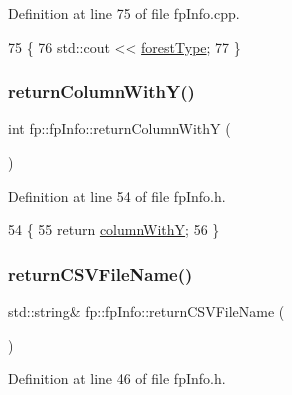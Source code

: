 Definition at line 75 of file fp\+Info.\+cpp.


\begin{DoxyCode}
75                                 \{
76         std::cout << \hyperlink{classfp_1_1fpInfo_a3001fbf80d86022e53578d6adf133b90}{forestType};
77     \}
\end{DoxyCode}
\mbox{\label{classfp_1_1fpInfo_a52ef3c184d39133dae472bb51e1287e7}} 
\subsubsection{\texorpdfstring{return\+Column\+With\+Y()}{returnColumnWithY()}}
{\footnotesize\ttfamily int fp\+::fp\+Info\+::return\+Column\+WithY (\begin{DoxyParamCaption}{ }\end{DoxyParamCaption})\hspace{0.3cm}{\ttfamily [inline]}}



Definition at line 54 of file fp\+Info.\+h.


\begin{DoxyCode}
54                                           \{
55                 \textcolor{keywordflow}{return} \hyperlink{classfp_1_1fpInfo_ac29e135cd84cdef547b678e7ea37f92d}{columnWithY};
56             \}
\end{DoxyCode}
\mbox{\label{classfp_1_1fpInfo_a78c57a1955263d343c794f2156cd0a76}} 
\subsubsection{\texorpdfstring{return\+C\+S\+V\+File\+Name()}{returnCSVFileName()}}
{\footnotesize\ttfamily std\+::string\& fp\+::fp\+Info\+::return\+C\+S\+V\+File\+Name (\begin{DoxyParamCaption}{ }\end{DoxyParamCaption})\hspace{0.3cm}{\ttfamily [inline]}}



Definition at line 46 of file fp\+Info.\+h.


